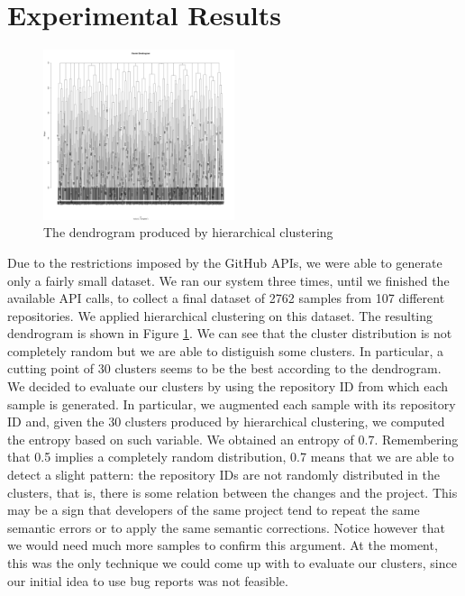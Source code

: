 \section{Experimental Results}
\label{sec:results}

\begin{figure}
  \centering
  \includegraphics[width=0.5\textwidth]{pictures/clust.png}
  \caption{The dendrogram produced by hierarchical clustering}
  \label{fig:clust}
\end{figure}

Due to the restrictions imposed by the GitHub APIs, we were able to generate only a fairly small dataset. We ran our system three times, until we finished the available API calls, to collect a final dataset of 2762 samples from 107 different repositories. We applied hierarchical clustering on this dataset. The resulting dendrogram is shown in Figure \ref{fig:clust}. We can see that the cluster distribution is not completely random but we are able to distiguish some clusters. In particular, a cutting point of 30 clusters seems to be the best according to the dendrogram. We decided to evaluate our clusters by using the repository ID from which each sample is generated. In particular, we augmented each sample with its repository ID and, given the 30 clusters produced by hierarchical clustering, we computed the entropy based on such variable. We obtained an entropy of 0.7. Remembering that 0.5 implies a completely random distribution, 0.7 means that we are able to detect a slight pattern: the repository IDs are not randomly distributed in the clusters, that is, there is some relation between the changes and the project. This may be a sign that developers of the same project tend to repeat the same semantic errors or to apply the same semantic corrections. Notice however that we would need much more samples to confirm this argument. At the moment, this was the only technique we could come up with to evaluate our clusters, since our initial idea to use bug reports was not feasible. 

